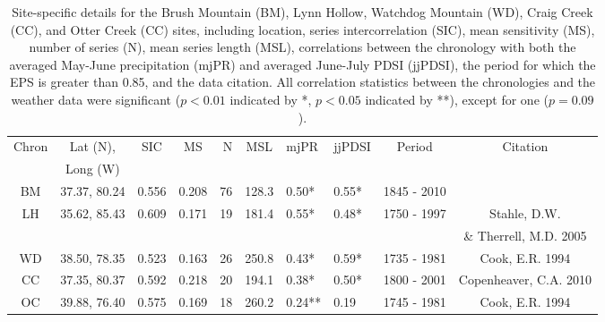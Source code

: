 \begin{table}
\begin{center}
\begin{tabular}{ccccrcllcc} \toprule
Chron & Lat (N), & SIC   & MS    & N & MSL &  mjPR & jjPDSI & Period & Citation\\ 
 &  Long (W) & &   & & &  & & & \\ \midrule
BM    &  37.37, 80.24 & 0.556 & 0.208 & 76        & 128.3   & 0.50*  & 0.55*   & 1845 - 2010 &         \\
LH    &  35.62, 85.43 & 0.609 & 0.171 & 19        & 181.4   & 0.55*  & 0.48*   & 1750 - 1997 &  Stahle, D.W.           \\
      &               &       &       &           &         &       &        &             &  \& Therrell, M.D. 2005 \\
WD    &  38.50, 78.35 & 0.523 & 0.163 & 26        & 250.8   & 0.43*  & 0.59*   & 1735 - 1981 &  Cook, E.R. 1994  \\
CC    &  37.35, 80.37 & 0.592 & 0.218 & 20        & 194.1   & 0.38*  & 0.50*   & 1800 - 2001 &  Copenheaver, C.A. 2010 \\
OC    &  39.88, 76.40 & 0.575 & 0.169 & 18        & 260.2   & 0.24** & 0.19 & 1745 - 1981 &  Cook, E.R. 1994  \\
\bottomrule
\end{tabular}
\end{center}
\caption{Site-specific details for the Brush Mountain (BM), Lynn Hollow, Watchdog Mountain (WD), Craig Creek (CC), and Otter Creek (CC) sites, including location, series intercorrelation (SIC), mean sensitivity (MS), number of series (N), mean series length (MSL), correlations between the chronology with both the averaged May-June precipitation (mjPR) and averaged June-July PDSI (jjPDSI), the period for which the EPS is greater than 0.85, and the data citation. All correlation statistics between the chronologies and the weather data were significant ($p<0.01$ indicated by *, $p<0.05$ indicated by **), except for one ($p=0.09$).}
\vspace{2cm}
\label{table:chronStats}
\end{table}

